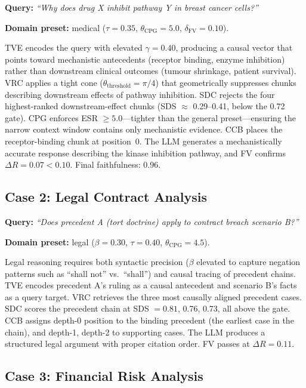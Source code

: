 \documentclass[10pt,twocolumn]{article}
\begin{document}
\noindent\textbf{Query:} \emph{``Why does drug X inhibit pathway Y in breast cancer cells?''}

\noindent\textbf{Domain preset:} medical ($\tau=0.35$, $\theta_\text{CPG}=5.0$, $\delta_\text{FV}=0.10$).

TVE encodes the query with elevated $\gamma=0.40$, producing a causal vector
that points toward mechanistic antecedents (receptor binding, enzyme inhibition)
rather than downstream clinical outcomes (tumour shrinkage, patient survival).
VRC applies a tight cone ($\theta_\text{threshold}=\pi/4$) that geometrically
suppresses chunks describing downstream effects of pathway inhibition.  SDC
rejects the four highest-ranked downstream-effect chunks (SDS $\approx$ 0.29--0.41,
below the 0.72 gate).  CPG enforces ESR $\geq 5.0$---tighter than the general
preset---ensuring the narrow context window contains only mechanistic evidence.
CCB places the receptor-binding chunk at position~0.  The LLM generates a
mechanistically accurate response describing the kinase inhibition pathway,
and FV confirms $\Delta R = 0.07 < 0.10$.  Final faithfulness: 0.96.

\subsection{Case 2: Legal Contract Analysis}

\noindent\textbf{Query:} \emph{``Does precedent A (tort doctrine) apply to contract breach scenario B?''}

\noindent\textbf{Domain preset:} legal ($\beta=0.30$, $\tau=0.40$, $\theta_\text{CPG}=4.5$).

Legal reasoning requires both syntactic precision ($\beta$ elevated to capture
negation patterns such as ``shall not'' vs.\ ``shall'') and causal tracing of
precedent chains.  TVE encodes precedent A's ruling as a causal antecedent
and scenario B's facts as a query target.  VRC retrieves the three most
causally aligned precedent cases.  SDC scores the precedent chain at SDS $= 0.81$,
0.76, 0.73, all above the gate.  CCB assigns depth-0 position to the binding
precedent (the earliest case in the chain), and depth-1, depth-2 to supporting
cases.  The LLM produces a structured legal argument with proper citation order.
FV passes at $\Delta R = 0.11$.

\subsection{Case 3: Financial Risk Analysis}
\end{document}
